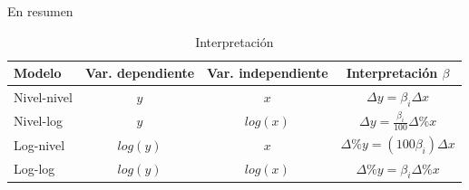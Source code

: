 \documentclass{beamer}
\begin{document}
\begin{frame}{En resumen}

\begin{table}[]
    \centering
    \begin{tabular}{l|c|c|c}
       Modelo  & Var. dependiente & Var. independiente & Interpretación $\beta$ \\ \hline 
       Nivel-nivel  & $y$ & $x$ & $\Delta y = \beta_i \Delta x$\\
       Nivel-log  & $y$ & $log(x)$ & $\Delta y = \frac{\beta_i}{100} \Delta \% x$ \\
       Log-nivel  & $log(y)$ & $x$ & $ \Delta\% y = (100 \beta_i) \Delta x$\\
       Log-log  & $log(y)$ & $log(x)$ & $ \Delta \% y = \beta_i \Delta \%x$\\
    \end{tabular}
    \caption{Interpretación}
    \label{tab:my_label}
\end{table}

\end{frame}
\end{document}
